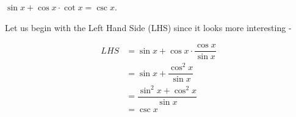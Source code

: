 
%
%
%
%
% 

\question[3] $\sin x+ \cos x\cdot\cot x=\csc x$.

\ifprintanswers
\fi

\begin{solution}[\halfpage]
  Let us begin with the Left Hand Side (LHS) since it looks more interesting -

  \begin{align}
  	LHS	&= \sin x+\cos x\cdot\dfrac{\cos x}{\sin x}	\\
        &= \sin x+\dfrac{\cos^2 x}{\sin x}			\\
		&= \dfrac{\sin^2 x+\cos^2 x}{\sin x}		\\
		&= \csc x
  \end{align} 
\end{solution}
